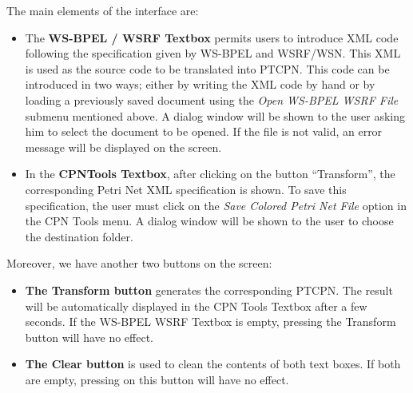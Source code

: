 The main elements of the interface are:
\begin{itemize}
\item{The \textbf{WS-BPEL / WSRF Textbox} permits users to introduce
XML code following the specification given by WS-BPEL and WSRF/WSN. This XML is
used as the source code to be translated into PTCPN.
This code can be introduced in two ways; either by writing the XML code by hand or
by loading a previously saved document using the \emph{Open WS-BPEL WSRF File} submenu mentioned above. A dialog window will be shown to the user asking him to select the document to be opened. If the file is not valid, an error message will be displayed on the screen.}

\item{In the \textbf{CPNTools Textbox}, after clicking on the button ``Transform'',
the corresponding Petri Net XML specification is shown. To save this specification, the user must click on the \emph{Save Colored Petri Net File} option in the CPN Tools menu. A dialog window will be shown to the user to choose the destination folder.}
\end{itemize}

Moreover, we have another two buttons on the screen:

\begin{itemize}
\item{\textbf{The Transform button}
generates the corresponding PTCPN. The result will be automatically displayed in the CPN Tools Textbox after a few seconds. If the WS-BPEL WSRF Textbox is empty, pressing the Transform button will have no effect.}

\item{\textbf{The Clear button}
is used to clean the contents of both text boxes. If both are empty, pressing on this button will have no effect.}
\end{itemize}

